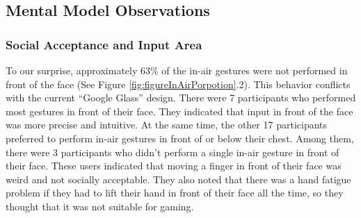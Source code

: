 \documentclass{sigchi}
\begin{document}
  \subsection{Mental Model Observations}
    \subsubsection{Social Acceptance and Input Area}
    To our surprise, approximately 63\% of the in-air gestures were not performed in front of the face (See Figure \ref{fig:figureInAirPorpotion}.2). This behavior conflicts with the current ``Google Glass'' design. There were 7 participants who performed most gestures in front of their face. They indicated that input in front of the face was more precise and intuitive. At the same time, the other 17 participants preferred to perform in-air gestures in front of or below their chest. Among them, there were 3 participants who didn't perform a single in-air gesture in front of their face. These users indicated that moving a finger in front of their face was weird and not socially acceptable. They also noted that there was a hand fatigue problem if they had to lift their hand in front of their face all the time, so they thought that it was not suitable for gaming.

\end{document}
